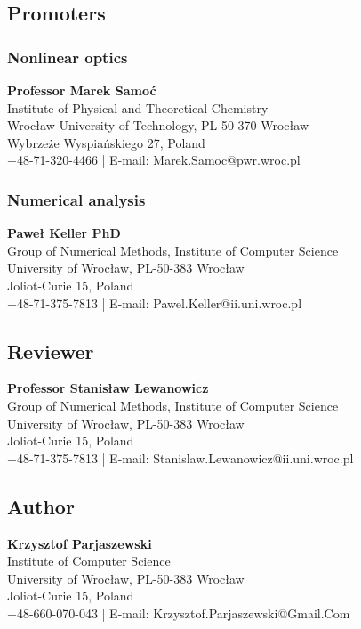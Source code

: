 \documentclass[12pt,twoside,a4paper]{article}
\numberwithin{equation}{subsection}
\numberwithin{figure}{subsection}
\begin{document}
\subsection*{Promoters} \label{chap:abstract_promotors}

\subsubsection*{Nonlinear optics}

\textbf{Professor Marek Samoć} \\
Institute of Physical and Theoretical Chemistry \\
Wrocław University of Technology, PL-50-370 Wrocław \\
Wybrzeże Wyspiańskiego 27, Poland \\
+48-71-320-4466 | E-mail: Marek.Samoc@pwr.wroc.pl

\subsubsection*{Numerical analysis}

\textbf{Paweł Keller PhD} \\
Group of Numerical Methods, Institute of Computer Science \\
University of Wrocław, PL-50-383 Wrocław \\
Joliot-Curie 15, Poland \\
+48-71-375-7813 | E-mail: Pawel.Keller@ii.uni.wroc.pl


\subsection*{Reviewer}  \label{chap:abstract_reviewer}

\textbf{Professor Stanisław Lewanowicz} \\
Group of Numerical Methods, Institute of Computer Science \\
University of Wrocław, PL-50-383 Wrocław \\
Joliot-Curie 15, Poland \\
+48-71-375-7813 | E-mail: Stanislaw.Lewanowicz@ii.uni.wroc.pl

\subsection*{Author}  \label{chap:abstract_author}

\textbf{Krzysztof Parjaszewski} \\
Institute of Computer Science \\
University of Wrocław, PL-50-383 Wrocław \\
Joliot-Curie 15, Poland \\
+48-660-070-043 | E-mail: Krzysztof.Parjaszewski@Gmail.Com
\end{document}
